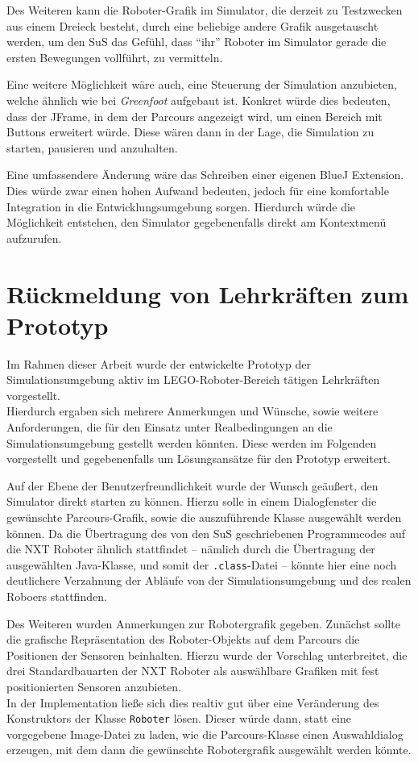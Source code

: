\documentclass[paper=a4, DIV=calc, BCOR=12mm, twoside=on, onecolumn=on, open = right, titlepage =on, parskip =half-, headsepline = on, footsepline = off, chapterprefix = off, appendixprefix = on, fontsize = 12pt, numbers = noenddot, abstract = on]{scrbook}
\begin{document}
Des Weiteren kann die Roboter-Grafik im Simulator, die derzeit zu Testzwecken aus einem Dreieck besteht, durch eine beliebige andere Grafik ausgetauscht werden, um den SuS das Gefühl, dass "`ihr"' Roboter im Simulator gerade die ersten Bewegungen vollführt, zu vermitteln.

Eine weitere Möglichkeit wäre auch, eine Steuerung der Simulation anzubieten, welche ähnlich wie bei \emph{Greenfoot} aufgebaut ist. Konkret würde dies bedeuten, dass der JFrame, in dem der Parcours angezeigt wird, um einen Bereich mit Buttons erweitert würde. Diese wären dann in der Lage, die Simulation zu starten, pausieren und anzuhalten.

Eine umfassendere Änderung wäre das Schreiben einer eigenen BlueJ Extension. Dies würde zwar einen hohen Aufwand bedeuten, jedoch für eine komfortable Integration in die Entwicklungsumgebung sorgen. Hierdurch würde die Möglichkeit entstehen, den Simulator gegebenenfalls direkt am Kontextmenü aufzurufen.

\section{Rückmeldung von Lehrkräften zum Prototyp}

Im Rahmen dieser Arbeit wurde der entwickelte Prototyp der Simulationsumgebung aktiv im \textsc{LEGO}-Roboter-Bereich tätigen Lehrkräften vorgestellt.\\
Hierdurch ergaben sich mehrere Anmerkungen und Wünsche, sowie weitere Anforderungen, die für den Einsatz unter Realbedingungen an die Simulationsumgebung gestellt werden könnten. Diese werden im Folgenden vorgestellt und gegebenenfalls um Lösungsansätze für den Prototyp erweitert.

Auf der Ebene der Benutzerfreundlichkeit wurde der Wunsch geäußert, den Simulator direkt starten zu können. Hierzu solle in einem Dialogfenster die gewünschte Parcours-Grafik, sowie die auszuführende Klasse ausgewählt werden können. Da die Übertragung des von den SuS geschriebenen Programmcodes auf die NXT Roboter ähnlich stattfindet -- nämlich durch die Übertragung der ausgewählten Java-Klasse, und somit der \texttt{.class}-Datei -- könnte hier eine noch deutlichere Verzahnung der Abläufe von der Simulationsumgebung und des realen Roboers stattfinden.

Des Weiteren wurden Anmerkungen zur Robotergrafik gegeben. Zunächst sollte die grafische Repräsentation des Roboter-Objekts auf dem Parcours die Positionen der Sensoren beinhalten. Hierzu wurde der Vorschlag unterbreitet, die drei Standardbauarten der NXT Roboter als auswählbare Grafiken mit fest positionierten Sensoren anzubieten.\\
In der Implementation ließe sich dies realtiv gut über eine Veränderung des Konstruktors der Klasse \texttt{Roboter} lösen. Dieser würde dann, statt eine vorgegebene Image-Datei zu laden, wie die Parcours-Klasse einen Auswahldialog erzeugen, mit dem dann die gewünschte Robotergrafik ausgewählt werden könnte.
\end{document}
